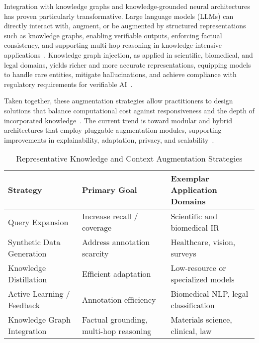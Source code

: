 \documentclass[sigconf]{acmart}
\begin{document}
Integration with knowledge graphs and knowledge-grounded neural architectures has proven particularly transformative. Large language models (LLMs) can directly interact with, augment, or be augmented by structured representations such as knowledge graphs, enabling verifiable outputs, enforcing factual consistency, and supporting multi-hop reasoning in knowledge-intensive applications~\cite{ref3, ref8, ref10, ref12, ref29, ref31, ref37, ref47, ref48, ref52, ref54, ref63}. Knowledge graph injection, as applied in scientific, biomedical, and legal domains, yields richer and more accurate representations, equipping models to handle rare entities, mitigate hallucinations, and achieve compliance with regulatory requirements for verifiable AI~\cite{ref3, ref29, ref47, ref54, ref63}.

Taken together, these augmentation strategies allow practitioners to design solutions that balance computational cost against responsiveness and the depth of incorporated knowledge~\cite{ref10, ref12, ref48, ref54, ref55, ref61, ref62}. The current trend is toward modular and hybrid architectures that employ pluggable augmentation modules, supporting improvements in explainability, adaptation, privacy, and scalability~\cite{ref31, ref32, ref33, ref55}.

\begin{table*}[htbp]
\centering
\caption{Representative Knowledge and Context Augmentation Strategies}
\label{tab:augmentation_strategies}
\begin{adjustbox}{max width=\textwidth}
\begin{tabular}{lll}
\toprule
\textbf{Strategy} & \textbf{Primary Goal} & \textbf{Exemplar Application Domains} \\
\midrule
Query Expansion         & Increase recall / coverage   & Scientific and biomedical IR \\
Synthetic Data Generation & Address annotation scarcity & Healthcare, vision, surveys \\
Knowledge Distillation  & Efficient adaptation        & Low-resource or specialized models \\
Active Learning / Feedback & Annotation efficiency        & Biomedical NLP, legal classification \\
Knowledge Graph Integration & Factual grounding, multi-hop reasoning & Materials science, clinical, law \\
\bottomrule
\end{tabular}
\end{adjustbox}
\end{table*}
\end{document}
